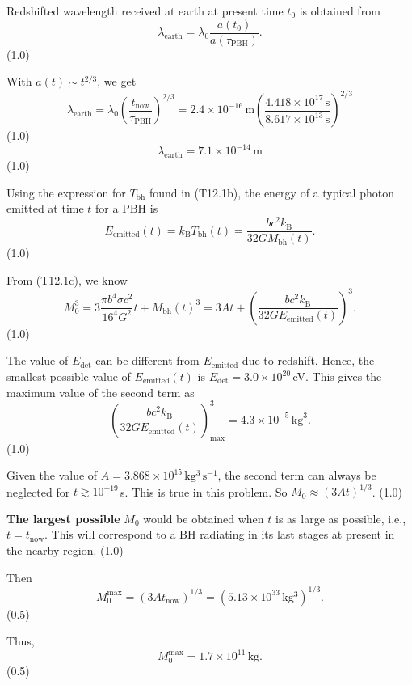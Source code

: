 \begin{description}
  Redshifted wavelength received at earth at present time $t_0$ is obtained
  from
  \[
    \lambda_{\mathrm{earth}}
    = \lambda_0 \frac{a(t_0)}{a(\tau_{\mathrm{PBH}})}.
  \]
  \hfill(1.0)

  With $a(t) \sim t^{2/3}$, we get
  \[
    \lambda_{\mathrm{earth}}
    = \lambda_0 \left(\frac{t_{\mathrm{now}}}{\tau_{\mathrm{PBH}}}\right)^{2/3}
    = 2.4 \times 10^{-16}\,\mathrm{m}
      \left(\frac{4.418 \times 10^{17}\,\mathrm{s}}
        {8.617 \times 10^{13}\,\mathrm{s}}\right)^{2/3}
  \]
  \hfill(1.0)
  \[
    \lambda_{\mathrm{earth}} = 7.1 \times 10^{-14}\,\mathrm{m}
  \]
  \hfill(1.0)

\item[(T12.2d)] Using the expression for $T_{\mathrm{bh}}$ found in
  (T12.1b), the energy of a typical photon emitted at time $t$ for a PBH is
  \[
    E_{\mathrm{emitted}}(t) = k_{\mathrm{B}} T_{\mathrm{bh}}(t)
    = \frac{b c^2 k_{\mathrm{B}}}{32 G M_{\mathrm{bh}}(t)}.
  \]
  \hfill(1.0)

  From (T12.1c), we know
  \[
    M_0^3 = 3\frac{\pi b^4 \sigma c^2}{16^4 G^2} t + M_{\mathrm{bh}}(t)^3
    = 3At + \left(\frac{b c^2 k_{\mathrm{B}}}
      {32 G E_{\mathrm{emitted}}(t)}\right)^3.
  \]
  \hfill(1.0)

  The value of $E_{\mathrm{det}}$ can be different from
  $E_{\mathrm{emitted}}$ due to redshift. Hence, the smallest possible value
  of $E_{\mathrm{emitted}}(t)$ is
  $E_{\mathrm{det}} = 3.0 \times 10^{20}$\,eV. This gives the maximum value
  of the second term as
  \[
    \left(\frac{b c^2 k_{\mathrm{B}}}
      {32 G E_{\mathrm{emitted}}(t)}\right)^3_{\mathrm{max}}
    = 4.3 \times 10^{-5}\,\mathrm{kg}^3.
  \]
  \hfill(1.0)

  Given the value of $A = 3.868 \times 10^{15}\,\mathrm{kg^3\,s^{-1}}$, the
  second term can always be neglected for $t \gtrsim 10^{-19}$\,s. This is
  true in this problem. So $M_0 \approx (3At)^{1/3}$. \hfill(1.0)

  \textbf{The largest possible} $M_0$ would be obtained when $t$ is as large
  as possible, i.e., $t = t_{\mathrm{now}}$. This will correspond to a BH
  radiating in its last stages at present in the nearby region. \hfill(1.0)

  Then
  \[
    M_0^{\mathrm{max}} = (3At_{\mathrm{now}})^{1/3}
    = (5.13 \times 10^{33}\,\mathrm{kg^3})^{1/3}.
  \]
  \hfill(0.5)

  Thus,
  \[
    M_0^{\mathrm{max}} = 1.7 \times 10^{11}\,\mathrm{kg}.
  \]
  \hfill(0.5)


\end{description}
